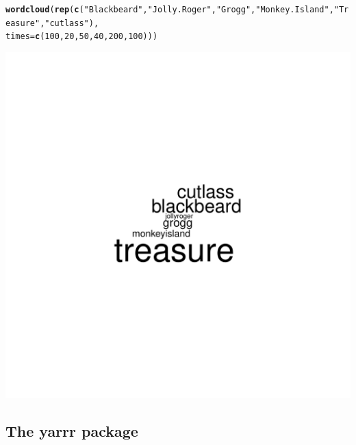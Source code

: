 \documentclass{tufte-book}\usepackage[]{graphicx}\usepackage[]{color}
\makeatletter
\def\maxwidth{ %
  \ifdim\Gin@nat@width>\linewidth
    \linewidth
  \else
    \Gin@nat@width
  \fi
}
\newcommand{\hlnum}[1]{\textcolor[rgb]{0.686,0.059,0.569}{#1}}%
\newcommand{\hlstr}[1]{\textcolor[rgb]{0.192,0.494,0.8}{#1}}%
\newcommand{\hlstd}[1]{\textcolor[rgb]{0.345,0.345,0.345}{#1}}%
\newcommand{\hlkwc}[1]{\textcolor[rgb]{0.333,0.667,0.333}{#1}}%
\newcommand{\hlkwd}[1]{\textcolor[rgb]{0.737,0.353,0.396}{\textbf{#1}}}%
\newenvironment{kframe}{%
 \def\at@end@of@kframe{}%
 \ifinner\ifhmode%
  \def\at@end@of@kframe{\end{minipage}}%
  \begin{minipage}{\columnwidth}%
 \fi\fi%
 \def\FrameCommand##1{\hskip\@totalleftmargin \hskip-\fboxsep
 \colorbox{shadecolor}{##1}\hskip-\fboxsep
     \hskip-\linewidth \hskip-\@totalleftmargin \hskip\columnwidth}%
 \MakeFramed {\advance\hsize-\width
   \@totalleftmargin\z@ \linewidth\hsize
   \@setminipage}}%
 {\par\unskip\endMakeFramed%
 \at@end@of@kframe}
\newenvironment{knitrout}{}{} %
\makeatother
\begin{document}
\begin{knitrout}
\color{fgcolor}\begin{kframe}
\begin{alltt}
\hlkwd{wordcloud}\hlstd{(}\hlkwd{rep}\hlstd{(}\hlkwd{c}\hlstd{(}\hlstr{"Blackbeard"}\hlstd{,} \hlstr{"Jolly.Roger"}\hlstd{,} \hlstr{"Grogg"}\hlstd{,} \hlstr{"Monkey.Island"}\hlstd{,} \hlstr{"Treasure"}\hlstd{,} \hlstr{"cutlass"}\hlstd{),}
              \hlkwc{times} \hlstd{=} \hlkwd{c}\hlstd{(}\hlnum{100}\hlstd{,} \hlnum{20}\hlstd{,} \hlnum{50}\hlstd{,} \hlnum{40}\hlstd{,} \hlnum{200}\hlstd{,} \hlnum{100}\hlstd{)))}
\end{alltt}


{\ttfamily\noindent\itshape\color{messagecolor}{\#\# Loading required package: tm\\\#\# Loading required package: NLP}}\end{kframe}
\includegraphics[width=\maxwidth]{figure/unnamed-chunk-8-1} 

\end{knitrout}


\subsection{The yarrr package}
\end{document}
